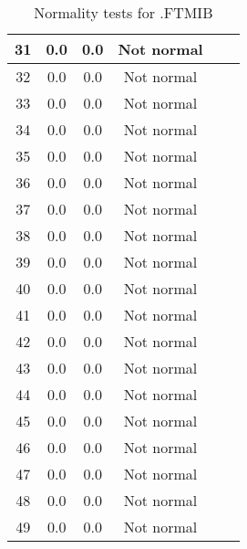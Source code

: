 \begin{table}[h]
\begin{tabular}{|c|c|c|c|c|c|}
		31 & 0.0 & 0.0 & Not normal\\\hline
		32 & 0.0 & 0.0 & Not normal\\\hline
		33 & 0.0 & 0.0 & Not normal\\\hline
		34 & 0.0 & 0.0 & Not normal\\\hline
		35 & 0.0 & 0.0 & Not normal\\\hline
		36 & 0.0 & 0.0 & Not normal\\\hline
		37 & 0.0 & 0.0 & Not normal\\\hline
		38 & 0.0 & 0.0 & Not normal\\\hline
		39 & 0.0 & 0.0 & Not normal\\\hline
		40 & 0.0 & 0.0 & Not normal\\\hline
		41 & 0.0 & 0.0 & Not normal\\\hline
		42 & 0.0 & 0.0 & Not normal\\\hline
		43 & 0.0 & 0.0 & Not normal\\\hline
		44 & 0.0 & 0.0 & Not normal\\\hline
		45 & 0.0 & 0.0 & Not normal\\\hline
		46 & 0.0 & 0.0 & Not normal\\\hline
		47 & 0.0 & 0.0 & Not normal\\\hline
		48 & 0.0 & 0.0 & Not normal\\\hline
		49 & 0.0 & 0.0 & Not normal\\\hline
	\end{tabular}
	\caption{Normality tests for .FTMIB}
	\label{tab:normality_tests_.FTMIB_}
\end{table}
